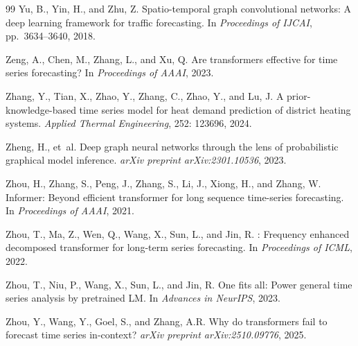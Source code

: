 \begin{thebibliography}{99}
Yu, B., Yin, H., and Zhu, Z.
\newblock Spatio-temporal graph convolutional networks: A deep learning framework for traffic forecasting.
\newblock In \emph{Proceedings of IJCAI}, pp.\ 3634--3640, 2018.

Zeng, A., Chen, M., Zhang, L., and Xu, Q.
\newblock Are transformers effective for time series forecasting?
\newblock In \emph{Proceedings of AAAI}, 2023.

Zhang, Y., Tian, X., Zhao, Y., Zhang, C., Zhao, Y., and Lu, J.
\newblock A prior-knowledge-based time series model for heat demand prediction of district heating systems.
\newblock \emph{Applied Thermal Engineering}, 252: 123696, 2024.

Zheng, H., et~al.
\newblock Deep graph neural networks through the lens of probabilistic graphical model inference.
\newblock \emph{arXiv preprint arXiv:2301.10536}, 2023.

Zhou, H., Zhang, S., Peng, J., Zhang, S., Li, J., Xiong, H., and Zhang, W.
\newblock Informer: Beyond efficient transformer for long sequence time-series forecasting.
\newblock In \emph{Proceedings of AAAI}, 2021.

Zhou, T., Ma, Z., Wen, Q., Wang, X., Sun, L., and Jin, R.
: Frequency enhanced decomposed transformer for long-term series forecasting.
\newblock In \emph{Proceedings of ICML}, 2022.

Zhou, T., Niu, P., Wang, X., Sun, L., and Jin, R.
\newblock One fits all: Power general time series analysis by pretrained {LM}.
\newblock In \emph{Advances in NeurIPS}, 2023.

Zhou, Y., Wang, Y., Goel, S., and Zhang, A.R.
\newblock Why do transformers fail to forecast time series in-context?
\newblock \emph{arXiv preprint arXiv:2510.09776}, 2025.

\end{thebibliography}
